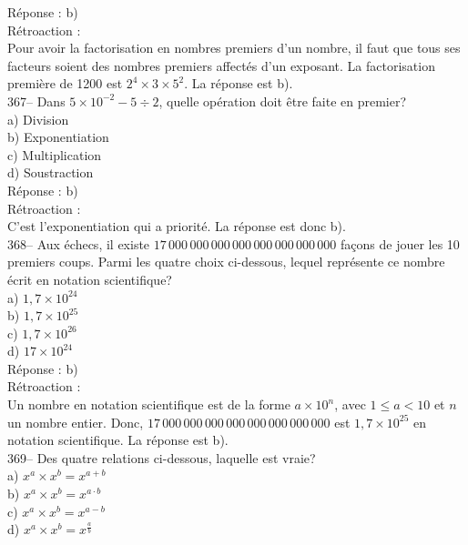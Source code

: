 ﻿\documentclass[letterpaper, 12pt]{article}
\begin{document}
R\'eponse : b)\\

R\'etroaction : \\
Pour avoir la factorisation en nombres premiers d'un nombre, il faut que
tous ses facteurs soient des nombres premiers affect\'es d'un exposant.  La
factorisation premi\`ere de 1200 est $2^{4}\times3\times5^{2}$.  La
r\'eponse est b).\\

367-- Dans $5\times10^{-2}-5\div2$, quelle op\'eration doit \^etre faite en
premier?\\
a) Division\\
b) Exponentiation\\
c) Multiplication\\
d) Soustraction\\

R\'eponse : b)\\

R\'etroaction : \\
C'est l'exponentiation qui a priorit\'e.  La r\'eponse est donc b).\\

368-- Aux \'echecs, il existe $17\,000\,000\,000\,000\,000\,000\,000\,000$
fa\c cons de jouer les 10 premiers coups.  Parmi les quatre choix
ci-dessous, lequel repr\'esente ce nombre \'ecrit en notation
scientifique?\\
a) $1,7\times10^{24}$\\
b) $1,7\times10^{25}$\\
c) $1,7\times10^{26}$\\
d) $17\times10^{24}$\\

R\'eponse : b)\\

R\'etroaction : \\
Un nombre en notation scientifique est de la forme $a\times10^{n}$, avec
$1\leq a<10$ et $n$ un nombre entier.  Donc,
$17\,000\,000\,000\,000\,000\,000\,000\,000$ est $1,7\times10^{25}$ en
notation scientifique. La r\'eponse est b).\\

369--  Des quatre relations ci-dessous, laquelle est vraie?\\
a) $x^{a}\times x^{b}=x^{a+b}$\\
b) $x^{a}\times x^{b}=x^{a\cdot b}$\\
c) $x^{a}\times x^{b}=x^{a-b}$\\
d) $x^{a}\times x^{b}=x^{\frac{a}{b}}$\\
\end{document}
